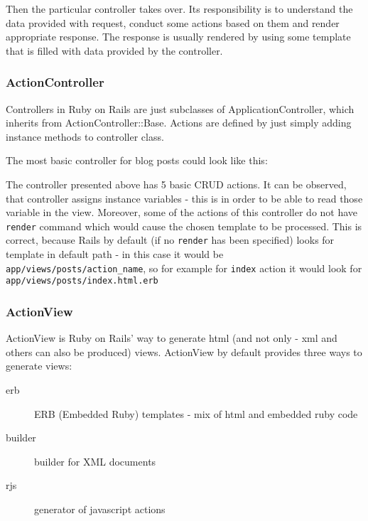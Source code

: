       Then the particular controller takes over. Its responsibility is to understand the data
      provided with request, conduct some actions based on them and render appropriate 
      response. The response is usually rendered by using some template that is filled with data
      provided by the controller.
      
      \subsubsection{ActionController}
      Controllers in Ruby on Rails are just subclasses of ApplicationController, which inherits
      from ActionController::Base. Actions are defined by just simply adding instance methods
      to controller class.
      
      The most basic controller for blog posts could look like this:

      
      
      The controller presented above has 5 basic CRUD actions. It can be observed, that controller
      assigns instance variables - this is in order to be able to read those variable in the view.
      Moreover, some of the actions of this controller do not have \texttt{render} command which would 
      cause the chosen template to be processed. This is correct, because Rails by default 
      (if no \texttt{render} has been specified) looks for template in default path - in this
      case it would be \texttt{app/views/posts/action\_name}, so for example for \texttt{index}
      action it would look for \texttt{app/views/posts/index.html.erb}
      
      \subsubsection{ActionView}
      ActionView is Ruby on Rails' way to generate html (and not only - xml and others can also be
      produced) views. ActionView by default provides three ways to generate views:
      
      \begin{description}
        \item[erb] ERB (Embedded Ruby) templates -  mix of html and embedded ruby code
        \item[builder] builder for XML documents
        \item[rjs] generator of javascript actions
      \end{description}
      
